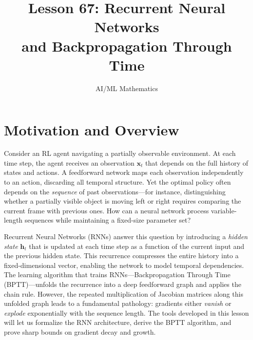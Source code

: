 \documentclass[11pt,a4paper]{article}
\title{Lesson 67: Recurrent Neural Networks\\and Backpropagation Through Time}
\author{AI/ML Mathematics}
\date{}
\begin{document}
\maketitle
\tableofcontents
\newpage

\section{Motivation and Overview}
\label{sec:motivation}

Consider an RL agent navigating a partially observable environment.
At each time step, the agent receives an observation $\mathbf{x}_t$
that depends on the full history of states and actions.  A feedforward
network maps each observation independently to an action, discarding
all temporal structure.  Yet the optimal policy often depends on the
\emph{sequence} of past observations---for instance, distinguishing
whether a partially visible object is moving left or right requires
comparing the current frame with previous ones.  How can a neural
network process variable-length sequences while maintaining a
fixed-size parameter set?

Recurrent Neural Networks (RNNs) answer this question by introducing
a \emph{hidden state} $\mathbf{h}_t$ that is updated at each time
step as a function of the current input and the previous hidden
state.  This recurrence compresses the entire history into a
fixed-dimensional vector, enabling the network to model temporal
dependencies.  The learning algorithm that trains RNNs---Backpropagation
Through Time (BPTT)---unfolds the recurrence into a deep feedforward
graph and applies the chain rule.  However, the repeated multiplication
of Jacobian matrices along this unfolded graph leads to a fundamental
pathology: gradients either \emph{vanish} or \emph{explode}
exponentially with the sequence length.  The tools developed in this
lesson will let us formalize the RNN architecture, derive the BPTT
algorithm, and prove sharp bounds on gradient decay and growth.
\end{document}
